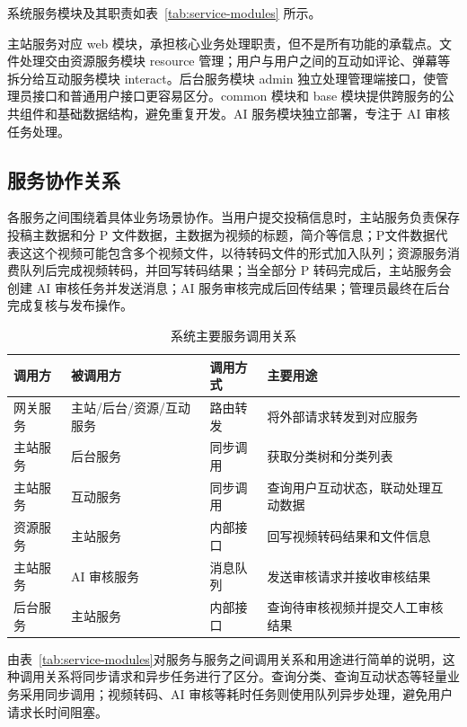 系统服务模块及其职责如表~\ref{tab:service-modules} 所示。

主站服务对应 web 模块，承担核心业务处理职责，但不是所有功能的承载点。文件处理交由资源服务模块 resource 管理；用户与用户之间的互动如评论、弹幕等拆分给互动服务模块 interact。后台服务模块 admin 独立处理管理端接口，使管理员接口和普通用户接口更容易区分。common 模块和 base 模块提供跨服务的公共组件和基础数据结构，避免重复开发。AI 服务模块独立部署，专注于 AI 审核任务处理。

\subsection{服务协作关系}
\label{subsec:service-call-relation}

各服务之间围绕着具体业务场景协作。当用户提交投稿信息时，主站服务负责保存投稿主数据和分 P 文件数据，主数据为视频的标题，简介等信息；P文件数据代表这这个视频可能包含多个视频文件，以待转码文件的形式加入队列；资源服务消费队列后完成视频转码，并回写转码结果；当全部分 P 转码完成后，主站服务会创建 AI 审核任务并发送消息；AI 服务审核完成后回传结果；管理员最终在后台完成复核与发布操作。

\begin{table}[htbp]
    \centering
    \caption{系统主要服务调用关系}
    \label{tab:service-call-relations}
    \begin{tabular}{p{}p{}p{}p{}}
    \hline
    \textbf{调用方} & \textbf{被调用方} & \textbf{调用方式} & \textbf{主要用途} \\
    \hline
    网关服务 & 主站/后台/资源/互动服务 & 路由转发 & 将外部请求转发到对应服务 \\
    主站服务 & 后台服务 & 同步调用 & 获取分类树和分类列表 \\
    主站服务 & 互动服务 & 同步调用 & 查询用户互动状态，联动处理互动数据 \\
    资源服务 & 主站服务 & 内部接口 & 回写视频转码结果和文件信息 \\
    主站服务 & AI 审核服务 & 消息队列 & 发送审核请求并接收审核结果 \\
    后台服务 & 主站服务 & 内部接口 & 查询待审核视频并提交人工审核结果 \\
    \hline
    \end{tabular}
\end{table}

由表~\ref{tab:service-modules}对服务与服务之间调用关系和用途进行简单的说明，这种调用关系将同步请求和异步任务进行了区分。查询分类、查询互动状态等轻量业务采用同步调用；视频转码、AI 审核等耗时任务则使用队列异步处理，避免用户请求长时间阻塞。

